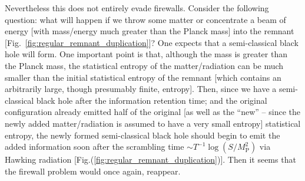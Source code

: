 \documentclass[12pt]{article}
\newcommand{\2}{$^2$}
\newcommand{\3}{$^3$}
\newcommand{\4}{$_4$}
\newcommand{\5}{$_5$}
\begin{document}
Nevertheless this does not entirely evade firewalls. Consider the following question: what will happen if we throw some matter or concentrate a beam of energy [with mass/energy much greater than the Planck mass] into the remnant [Fig.~\ref{fig:regular_remnant_duplication}]? One expects that a semi-classical black hole will form. One important point is that, although the mass is greater than the Planck mass, the statistical entropy of the matter/radiation can be much smaller than the initial statistical entropy of the remnant [which contains an arbitrarily large, though presumably finite, entropy]. Then, since we have a semi-classical black hole after the information retention time; and the original configuration already emitted half of the original [as well as the ``new'' -- since the newly added matter/radiation is assumed to have a very small entropy] statistical entropy, the newly formed semi-classical black hole should begin to emit the added information soon after the scrambling time $\sim T^{-1} \log (S/M_{\text{P}}^2)$ \cite{Hayden:2007cs} via Hawking radiation [Fig.(\ref{fig:regular_remnant_duplication})]. Then it seems that the firewall problem would once again, reappear. 
\end{document}
